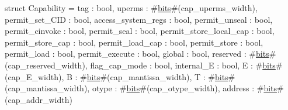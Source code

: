 struct Capability = {
  tag                    : bool,
  uperms                 : #\hyperref[sailRISCVzbits]{bits}#(cap_uperms_width),
  permit_set_CID         : bool,
  access_system_regs     : bool,
  permit_unseal          : bool,
  permit_cinvoke         : bool,
  permit_seal            : bool,
  permit_store_local_cap : bool,
  permit_store_cap       : bool,
  permit_load_cap        : bool,
  permit_store           : bool,
  permit_load            : bool,
  permit_execute         : bool,
  global                 : bool,
  reserved               : #\hyperref[sailRISCVzbits]{bits}#(cap_reserved_width),
  flag_cap_mode          : bool,
  internal_E             : bool,
  E                      : #\hyperref[sailRISCVzbits]{bits}#(cap_E_width),
  B                      : #\hyperref[sailRISCVzbits]{bits}#(cap_mantissa_width),
  T                      : #\hyperref[sailRISCVzbits]{bits}#(cap_mantissa_width),
  otype                  : #\hyperref[sailRISCVzbits]{bits}#(cap_otype_width),
  address                : #\hyperref[sailRISCVzbits]{bits}#(cap_addr_width)
}
